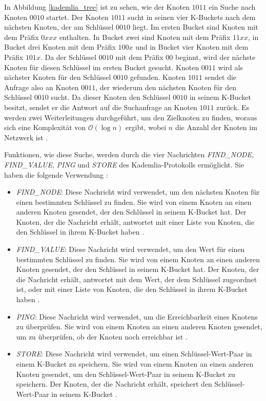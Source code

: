 \noindent In Abbildung \ref{kademlia_tree} ist zu sehen, wie der Knoten $1011$ ein Suche nach Knoten $0010$ startet. Der Knoten $1011$ sucht in seinen vier K-Buckets nach dem nächsten Knoten, der am Schlüssel $0010$ liegt. Im ersten Bucket sind Knoten mit dem Präfix $0xxx$ enthalten. In Bucket zwei sind Knoten mit dem Präfix $11xx$, in Bucket drei Knoten mit dem Präfix $100x$ und in Bucket vier Knoten mit dem Präfix $101x$. Da der Schlüssel $0010$ mit dem Präfix $00$ beginnt, wird der nächste Knoten für diesen Schlüssel im ersten Bucket gesucht. Knoten $0011$ wird als nächster Knoten für den Schlüssel $0010$ gefunden. Knoten $1011$ sendet die Anfrage also an Knoten $0011$, der wiederum den nächsten Knoten für den Schlüssel $0010$ sucht. Da dieser Knoten den Schlüssel $0010$ in seinem K-Bucket besitzt, sendet er die Antwort auf die Suchanfrage an Knoten $1011$ zurück. Es werden zwei Weiterleitungen durchgeführt, um den Zielknoten zu finden, woraus sich eine Komplexität von $\mathcal{O}(\log n)$ ergibt, wobei $n$ die Anzahl der Knoten im Netzwerk ist \parencite[S. 812]{MedranoChavez_ChordKademliaHighChurnScenarios}.

Funktionen, wie diese Suche, werden durch die vier Nachrichten \textit{FIND\_NODE}, \\\textit{FIND\_VALUE}, \textit{PING} und \textit{STORE} des Kademlia-Protokolls ermöglicht. Sie haben die folgende Verwendung \Parencite[S. 3]{Maymounkov_Kademlia}:

\begin{itemize}
    \item \textit{FIND\_NODE}: Diese Nachricht wird verwendet, um den nächsten Knoten für einen bestimmten Schlüssel zu finden. Sie wird von einem Knoten an einen anderen Knoten gesendet, der den Schlüssel in seinem K-Bucket hat. Der Knoten, der die Nachricht erhält, antwortet mit einer Liste von Knoten, die den Schlüssel in ihrem K-Bucket haben \Parencite[S. 3]{Maymounkov_Kademlia}. 
    \item \textit{FIND\_VALUE}: Diese Nachricht wird verwendet, um den Wert für einen bestimmten Schlüssel zu finden. Sie wird von einem Knoten an einen anderen Knoten gesendet, der den Schlüssel in seinem K-Bucket hat. Der Knoten, der die Nachricht erhält, antwortet mit dem Wert, der dem Schlüssel zugeordnet ist, oder mit einer Liste von Knoten, die den Schlüssel in ihrem K-Bucket haben \Parencite[S. 3]{Maymounkov_Kademlia}.
    \item \textit{PING}: Diese Nachricht wird verwendet, um die Erreichbarkeit eines Knotens zu überprüfen. Sie wird von einem Knoten an einen anderen Knoten gesendet, um zu überprüfen, ob der Knoten noch erreichbar ist \Parencite[S. 2-3]{Maymounkov_Kademlia}.
    \item \textit{STORE}: Diese Nachricht wird verwendet, um einen Schlüssel-Wert-Paar in einem K-Bucket zu speichern. Sie wird von einem Knoten an einen anderen Knoten gesendet, um den Schlüssel-Wert-Paar in seinem K-Bucket zu speichern. Der Knoten, der die Nachricht erhält, speichert den Schlüssel-Wert-Paar in seinem K-Bucket \Parencite[S. 3]{Maymounkov_Kademlia}.
\end{itemize}

